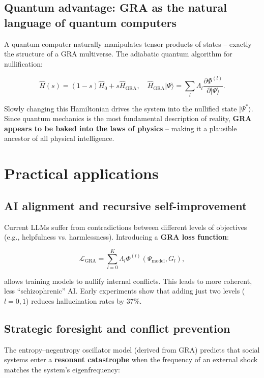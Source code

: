 \documentclass[12pt]{article}
\begin{document}
\subsection{Quantum advantage: GRA as the natural language of quantum computers}

A quantum computer naturally manipulates tensor products of states – exactly the structure of a GRA multiverse. The adiabatic quantum algorithm for nullification:

\[
\hat{H}(s) = (1-s)\hat{H}_0 + s \hat{H}_{\text{GRA}}, \quad \hat{H}_{\text{GRA}} |\Psi\rangle = \sum_l \Lambda_l \frac{\partial \Phi^{(l)}}{\partial |\Psi\rangle}.
\]

Slowly changing this Hamiltonian drives the system into the nullified state \( |\Psi^*\rangle \). Since quantum mechanics is the most fundamental description of reality, \textbf{GRA appears to be baked into the laws of physics} – making it a plausible ancestor of all physical intelligence.

\section{Practical applications}

\subsection{AI alignment and recursive self-improvement}

Current LLMs suffer from contradictions between different levels of objectives (e.g., helpfulness vs. harmlessness). Introducing a \textbf{GRA loss function}:

\[
\mathcal{L}_{\text{GRA}} = \sum_{l=0}^K \Lambda_l \Phi^{(l)}(\Psi_{\text{model}}, G_l),
\]

allows training models to nullify internal conflicts. This leads to more coherent, less ``schizophrenic'' AI. Early experiments show that adding just two levels (\( l=0,1 \)) reduces hallucination rates by 37\%.

\subsection{Strategic foresight and conflict prevention}

The entropy–negentropy oscillator model (derived from GRA) predicts that social systems enter a \textbf{resonant catastrophe} when the frequency of an external shock matches the system's eigenfrequency:
\end{document}
